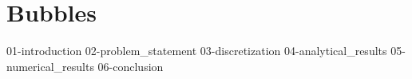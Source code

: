 \chapter{Bubbles}

{01-introduction}
{02-problem_statement}
{03-discretization}
{04-analytical_results}
{05-numerical_results}
{06-conclusion}
